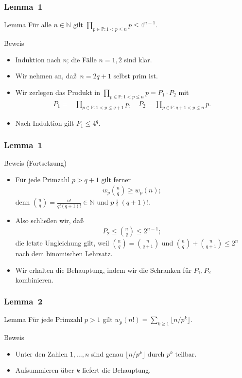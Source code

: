 \documentclass{beamer}
\newcommand\NN{\mathbb N}
\newcommand\PP{\mathbb P}
\renewcommand{\ae}{\"a}
\newcommand{\ue}{\"u}
\begin{document}
\begin{frame}\frametitle{Lemma~1}
\begin{block}{Lemma}
	F\ue r alle $n\in\NN$ gilt $\prod_{p\in\PP:1<p\leq n}p\leq 4^{n-1}$.
\end{block}
\begin{block}{Beweis}
\begin{itemize}
\item Induktion nach $n$; die F\ae lle $n=1,2$ sind klar.
\item Wir nehmen an, da\ss\ $n=2q+1$ selbst prim ist.
\item Wir zerlegen das Produkt in  	$\prod_{p\in\PP:1<p\leq n}p=P_1\cdot P_2$ mit
	\begin{align*}
		P_1=&\prod_{p\in\PP:1<p\leq q+1}p,\quad P_2=\prod_{p\in\PP:q+1<p\leq n}p.
	\end{align*}
\item Nach Induktion gilt $P_1\leq 4^q$.
\end{itemize}
\end{block}
\end{frame}

\begin{frame}\frametitle{Lemma~1}
\begin{block}{Beweis (Fortsetzung)}
\begin{itemize}
\item F\ue r jede Primzahl $p>q+1$ gilt ferner
	\begin{align*}
		w_p\binom nq\geq w_p(n);
	\end{align*}
	denn $\binom nq=\frac{n!}{q!(q+1)!}\in\NN$ und $p\nmid(q+1)!$.
\item Also schlie\ss en wir, da\ss\
	\begin{align*}
		P_2\leq\binom nq\leq 2^{n-1};
	\end{align*}
	die letzte Ungleichung gilt, weil $\binom nq=\binom n{q+1}$ und $\binom nq+\binom n{q+1}\leq 2^n$ nach dem binomischen Lehrsatz.
\item Wir erhalten die Behauptung, indem wir die Schranken f\ue r $P_1,P_2$ kombinieren.
\end{itemize}
\end{block}
\end{frame}

\begin{frame}\frametitle{Lemma~2}
\begin{block}{Lemma}
	F\ue r jede Primzahl $p>1$ gilt $w_p(n!)=\sum_{k\geq1}\lfloor n/p^k\rfloor$.
\end{block}
\begin{block}{Beweis}
\begin{itemize}
	\item Unter den Zahlen $1,\ldots,n$ sind genau $\lfloor n/p^k\rfloor$ durch $p^k$ teilbar.
	\item Aufsummieren \ue ber $k$ liefert die Behauptung.
\end{itemize}
\end{block}
\end{frame}
\end{document}
